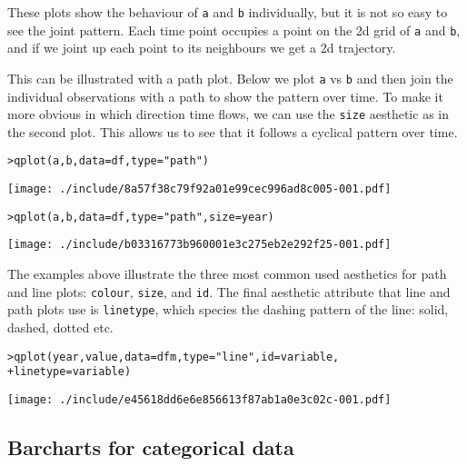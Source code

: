These plots show the behaviour of {\tt a} and {\tt b} individually, but it is not so easy to see the joint pattern.  Each time point occupies a point on the 2d grid of {\tt a} and {\tt b}, and if we joint up each point to its neighbours we get a 2d trajectory.

This can be illustrated with a path plot.  Below we plot {\tt a} vs {\tt b} and then join the individual observations with a path to show the pattern over time.  To make it more obvious in which direction time flows, we can use the {\tt size} aesthetic as in the second plot.   This allows us to see that it follows a cyclical pattern over time.

\begin{alltt}
> qplot(a, b, data = df, type = "path")
\end{alltt}
\texttt{[image: ./include/8a57f38c79f92a01e99cec996ad8c005-001.pdf]}
\begin{alltt}

> qplot(a, b, data = df, type = "path", size = year)
\end{alltt}
\texttt{[image: ./include/b03316773b960001e3c275eb2e292f25-001.pdf]}
\begin{alltt}

\end{alltt}

The examples above illustrate the three most common used aesthetics for path and line plots: {\tt colour}, {\tt size}, and {\tt id}.  The final aesthetic attribute that line and path plots use is {\tt linetype}, which species the dashing pattern of the line: solid, dashed, dotted etc.

\begin{alltt}
> qplot(year, value, data = dfm, type = "line", id = variable, 
+     linetype = variable)
\end{alltt}
\texttt{[image: ./include/e45618dd6e6e856613f87ab1a0e3c02c-001.pdf]}
\begin{alltt}

\end{alltt}

\subsection{Barcharts for categorical data}\label{sub:bar_plots}

